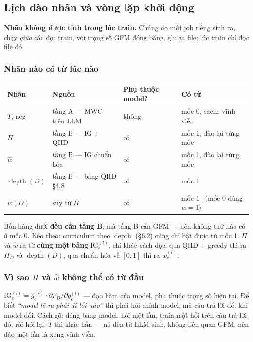 \documentclass[11pt,a4paper]{article}
\DeclareMathOperator{\depthop}{depth}
\begin{document}
\subsection{Lịch đào nhãn và vòng lặp khởi động}

\textbf{Nhãn không được tính trong lúc train.} Chúng do một job riêng sinh ra, chạy
\emph{giữa} các đợt train, với trọng số GFM đóng băng, ghi ra file; lúc train chỉ đọc file
đó.

\subsubsection*{Nhãn nào có từ lúc nào}

\begin{center}
\begin{tabular}{@{}llll@{}}
\toprule
Nhãn & Nguồn & Phụ thuộc model? & Có từ \\
\midrule
$T$, neg      & tầng A --- MWC trên LLM & không & mốc 0, cache vĩnh viễn \\
$\Pi$         & tầng B --- IG $+$ QHĐ       & có    & mốc 1, đào lại từng mốc \\
$\widehat w$  & tầng B --- IG chuẩn hóa     & có    & mốc 1, đào lại từng mốc \\
$\depthop(D)$ & tầng B --- bảng QHĐ \S4.8   & có    & mốc 1 \\
$w(D)$        & suy từ $\Pi$                & có    & mốc 1 \ (mốc 0 dùng $w=1$) \\
\bottomrule
\end{tabular}
\end{center}

Bốn hàng dưới \textbf{đều cần tầng B}, mà tầng B cần GFM --- nên không thứ nào có ở mốc 0.
Kéo theo: curriculum theo $\depthop$ (\S6.2) cũng chỉ bật được từ mốc 1. $\Pi$ và
$\widehat w$ ra từ \textbf{cùng một bảng} $\mathrm{IG}_e^{(l)}$, chỉ khác cách đọc: qua QHĐ
$+$ greedy thì ra $\Pi_D$ và $\depthop(D)$, qua chuẩn hóa về $[0,1]$ thì ra
$\widehat w_e^{(l)}$.

\subsubsection*{Vì sao $\Pi$ và $\widehat w$ không thể có từ đầu}

$\mathrm{IG}_e^{(l)}=\hat g_e^{(l)}\cdot\partial F_B/\partial g_e^{(l)}$ --- đạo hàm của
model, phụ thuộc trọng số hiện tại. Để biết \emph{``model lẽ ra phải đi lối nào''} thì phải
hỏi chính model, mà câu trả lời đổi khi model đổi. Cách gỡ: đóng băng model, hỏi một lần,
train một hồi trên câu trả lời đó, rồi hỏi lại. $T$ thì khác hẳn --- nó đến từ LLM sinh,
không liên quan GFM, nên đào một lần là xong vĩnh viễn.
\end{document}
